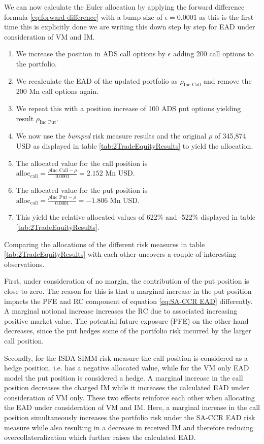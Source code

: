 \documentclass[../Thesis_AHoecherl.tex]{subfiles}
\begin{document}
    We can now calculate the Euler allocation by applying the forward difference formula \ref{eq:forward difference} with a bump size of $\epsilon = 0.0001$ as this is the first time this is explicitly done we are writing this down step by step for \gls{EAD} under consideration of \gls{VM} and IM.

    \begin{enumerate}
        \item We increase the position in ADS call options by $\epsilon$ adding 200 call options to the portfolio.
        \item We recalculate the \gls{EAD} of the updated portfolio as $\rho_{\text{Inc Call}}$ and remove the 200 Mn call options again.
        \item We repeat this with a position increase of 100 ADS put options yielding result $\rho_{\text{Inc Put}}$.
        \item We now use the \emph{bumped} risk measure results and the original $\rho$ of 345,874 USD as displayed in table \ref{tab:2TradeEquityResults} to yield the allocation.
        \item The allocated value for the call position is $\text{alloc}_\text{call}=\frac{\rho{\text{Inc Call}-\rho}}{0.0001} = 2.152 \text{ Mn USD}$.
        \item The allocated value for the put position is $\text{alloc}_\text{call}=\frac{\rho{\text{Inc Put}-\rho}}{0.0001} = -1.806 \text{ Mn USD}$.
        \item This yield the relative allocated values of 622\% and -522\% displayed in table \ref{tab:2TradeEquityResults}.
    \end{enumerate}

    Comparing the allocations of the different risk measures in table \ref{tab:2TradeEquityResults} with each other uncovers a couple of interesting observations. 
    
    First, under consideration of no margin, the contribution of the put position is close to zero. 
    The reason for this is that a marginal increase in the put position impacts the PFE and RC component of equation \ref{eq:SA-CCR EAD} differently. A marginal notional increase increases the RC due to associated increasing positive market value.
    The potential future exposure (PFE) on the other hand decreases, since the put hedges some of the portfolio risk incurred by the larger call position.

    Secondly, for the \gls{ISDA SIMM} risk measure the call position is considered as a hedge position, i.e. has a negative allocated value, while for the \gls{VM} only \gls{EAD} model the put position is considered a hedge. 
    A marginal increase in the call position decreases the charged \gls{IM} while it increases the calculated \gls{EAD} under consideration of \gls{VM} only. 
    These two effects reinforce each other when allocating the \gls{EAD} under consideration of \gls{VM} and IM. Here, a marginal increase in the call position simultaneously increases the portfolio risk under the \gls{SA-CCR} \gls{EAD} risk measure while also resulting in a decrease in received \gls{IM} and therefore reducing overcollateralization which further raises the calculated EAD. 
    
\end{document}
